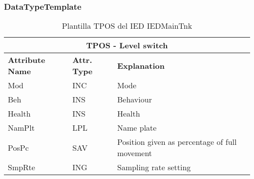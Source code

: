     \subsubsection{DataTypeTemplate}
    \begin{table}[H]
    \begin{center}
    \begin{tabular}{|l|l|p{8.5cm}|}
            \hline
            \multicolumn{3}{|c|}{\cellcolor[gray]{0.8} \textbf{ TPOS}  - Level switch} \\
            \hline
            \textbf{Attribute Name} & \textbf{Attr. Type} & \textbf{Explanation} \\
            \hline 
            Mod & INC & Mode \\
            \hline
            Beh & INS & Behaviour \\
            \hline
            Health & INS & Health \\
            \hline
            NamPlt & LPL & Name plate \\
            \hline
            PosPc & SAV & Position given as percentage of full movement \\
            \hline
            SmpRte & ING & Sampling rate setting \\
            \hline
    \end{tabular}
    \caption{Plantilla TPOS del IED IEDMainTnk}
    \label{table:lnTypeTPOS_lvl_sw}
    \end{center}
    \end{table}
    
    
    